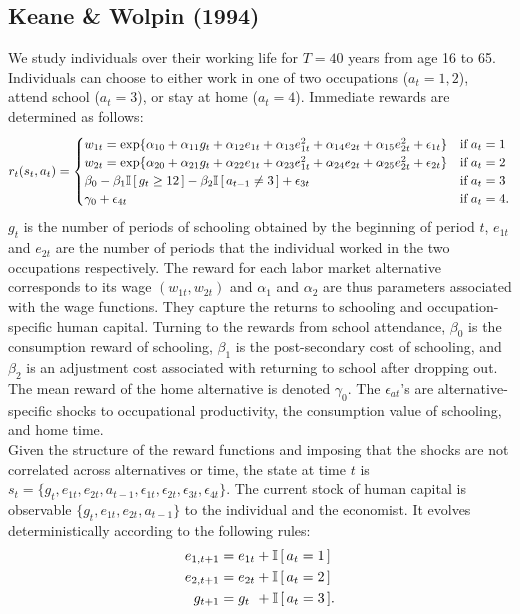 \subsection{Keane \& Wolpin (1994)}
We study individuals over their working life for $T = 40$ years from age 16 to 65. Individuals can choose to either work in one of two occupations ($a_t = 1, 2$), attend school ($a_t = 3$), or stay at home ($a_t = 4$). Immediate rewards are determined as follows:
%
\begin{align*}
r_t(s_t, a_t) = \begin{cases} w_{1t} =
\exp\{\alpha_{10} + \alpha_{11}g_t + \alpha_{12}e_{1t} + \alpha_{13}e^2_{1t} + \alpha_{14}e_{2t} + \alpha_{15}e^2_{2t} + \epsilon_{1t}\} & \text{if}\; a_t = 1 \\
w_{2t} = \exp\{\alpha_{20} + \alpha_{21}g_t + \alpha_{22}e_{1t} + \alpha_{23}e^2_{1t} + \alpha_{24}e_{2t} + \alpha_{25}e^2_{2t} + \epsilon_{2t}\}& \text{if}\; a_t = 2 \\
\beta_0 - \beta_1 \mathbb{I}\,[\,g_t \geq 12\,] - \beta_2\mathbb{I}\,[\,a_{t - 1} \neq 3\,] + \epsilon_{3t}& \text{if}\; a_t = 3 \\
\gamma_0 + \epsilon_{4t}& \text{if}\; a_t = 4. \\
\end{cases}
\end{align*}
%
$g_t$ is the number of periods of schooling obtained by the beginning of period $t$, $e_{1t}$ and $e_{2t}$ are the number of periods that the individual worked in the two occupations respectively. The reward for each labor market alternative corresponds to its wage $(w_{1t}, w_{2t})$ and $\alpha_{1}$ and $\alpha_{2}$ are thus parameters associated with the wage functions. They capture the returns to schooling and occupation-specific human capital. Turning to the rewards from school attendance, $\beta_0$ is the consumption reward of schooling, $\beta_1$ is the post-secondary cost of schooling, and $\beta_2$ is an adjustment cost associated with returning to school after dropping out. The mean reward of the home alternative is denoted $\gamma_0$. The $\epsilon_{at}$'s are alternative-specific shocks to occupational productivity, the consumption value of schooling, and home time.\\

\noindent Given the structure of the reward functions and imposing that the shocks are not correlated across alternatives or time, the state at time $t$ is $s_t = \{g_t,e_{1t},e_{2t},a_{t - 1},\epsilon_{1t},\epsilon_{2t},\epsilon_{3t},\epsilon_{4t}\}$.
%
The current stock of human capital is observable $\{g_t,e_{1t},e_{2t},a_{t - 1}\}$ to the individual and the economist. It evolves deterministically according to the following rules:
%
\begin{align*}
    e_{1,t+1} &= e_{1t} + \mathbb{I}\,[\,a_t = 1\,] \\
    e_{2,t+1} &= e_{2t} + \mathbb{I}\,[\,a_t = 2\,] \\
    g_{t+1}   &= g_{t\phantom{2}}    +  \mathbb{I}\,[\,a_t = 3\,].
\end{align*}

